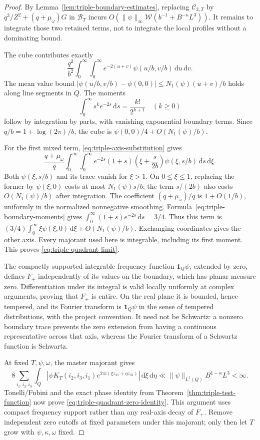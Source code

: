 \documentclass[11pt]{article}
\newcommand{\ii}{\mathrm i}
\newcommand{\CT}{\mathcal C_{3,T}}
\newcommand{\dd}{\,\mathrm d}
\begin{document}
\begin{proof}
By Lemma~\ref{lem:triple-boundary-estimates}, replacing \(\CT\) by
\(q^3/Z^2+(q+\mu_\omega)G\) in \(\mathcal B_T\) incurs
\(O(\|\psi\|_\infty\mathcal W(b^{-1}+B^{-\kappa}L^3))\).
It remains to integrate those two retained terms, not to integrate
the local profiles without a dominating bound.

The cube contributes exactly
\[
 \frac{q^2}{b^2}\int_0^\infty\int_0^\infty
 e^{-2(u+v)}\psi(u/b,v/b)\dd u\dd v.
\]
The mean value bound
\(|\psi(u/b,v/b)-\psi(0,0)|\leq N_1(\psi)(u+v)/b\)
holds along line segments in \(Q\). The moments
\begin{equation}\label{eq:triple-boundary-moments}
 \int_0^\infty s^k e^{-2s}\dd s=\frac{k!}{2^{k+1}}
 \quad(k\geq0)
\end{equation}
follow by integration by parts, with vanishing exponential boundary
terms. Since \(q/b=1+\log(2\pi)/b\), the cube is
\(\psi(0,0)/4+O(N_1(\psi)/b)\).

For the first mixed term, \eqref{eq:triple-axis-substitution} gives
\[
 \frac{q+\mu_\omega}{q}
 \int_0^\infty\int_0^\infty
 e^{-2s}(1+s)\left(\xi+\frac{s}{2b}\right)
                   \psi(\xi,s/b)\dd s\dd\xi.
\]
Both \(\psi(\xi,s/b)\) and its trace vanish for \(\xi>1\).
On \(0\leq\xi\leq1\), replacing the former by \(\psi(\xi,0)\)
costs at most \(N_1(\psi)s/b\); the term \(s/(2b)\) also costs
\(O(N_1(\psi)/b)\) after integration. The coefficient
\((q+\mu_\omega)/q\) is \(1+O(1/b)\), uniformly in the normalized
nonnegative smoothing. Formula~\eqref{eq:triple-boundary-moments}
gives \(\int_0^\infty(1+s)e^{-2s}\dd s=3/4\).
Thus this term is \((3/4)\int_0^\infty\xi\psi(\xi,0)\dd\xi
+O(N_1(\psi)/b)\). Exchanging coordinates gives the other axis.
Every majorant used here is integrable, including its first moment.
This proves \eqref{eq:triple-quadrant-limit}.

The compactly supported integrable frequency function
\(\mathbf1_Q\psi\), extended by zero, defines \(F_+\) independently
of its values on the boundary, which has planar measure zero.
Differentiation under its integral is valid locally uniformly at complex
arguments, proving that \(F_+\) is entire. On the real plane it is
bounded, hence tempered, and its Fourier transform is
\(\mathbf1_Q\psi\) in the sense of tempered distributions, with the
project convention. It need not be Schwartz: a nonzero boundary trace
prevents the zero extension from having a continuous representative
across that axis, whereas the Fourier transform of a Schwartz function
is Schwartz.

At fixed \(T,\psi,\omega\), the master majorant gives
\[
 8\sum_{i_1,i_2,i_3}\int_Q
 |\psi K_T(i_2,i_3,i_1)e^{2\pi\ii(\xi z_{21}+\eta z_{31})}|
 \dd\xi\dd\eta
 \ll\|\psi\|_{L^1(Q)}B^{1-\kappa}L^3<\infty.
\]
Tonelli/Fubini and the exact phase identity from
Theorem~\ref{thm:triple-test-function} now prove
\eqref{eq:triple-quadrant-zero-identity}. This argument uses compact
frequency support rather than any real-axis decay of \(F_+\).
Remove independent zero cutoffs at fixed parameters under this majorant;
only then let \(T\) grow with \(\psi,\kappa,\omega\) fixed.
\end{proof}
\end{document}
